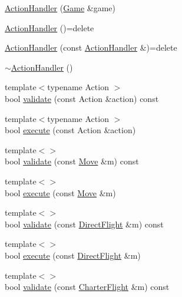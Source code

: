 \begin{DoxyCompactItemize}
\item 
\hyperlink{classpan_1_1_action_handler_a5aeb269dae11a6bd190fafd945a508a1}{Action\+Handler} (\hyperlink{classpan_1_1_game}{Game} \&game)
\item 
\hyperlink{classpan_1_1_action_handler_a56b3a54ca19b9d071adffa0a9ac7b266}{Action\+Handler} ()=delete
\item 
\hyperlink{classpan_1_1_action_handler_a403ff5c81573b682a5dfc9d476be8e4e}{Action\+Handler} (const \hyperlink{classpan_1_1_action_handler}{Action\+Handler} \&)=delete
\item 
\hyperlink{classpan_1_1_action_handler_a5bf64631c974765b04def48c0df0fcd7}{$\sim$\+Action\+Handler} ()
\item 
{\footnotesize template$<$typename Action $>$ }\\bool \hyperlink{classpan_1_1_action_handler_ae2a8bd5ae0560677aeafe7b6c068adb7}{validate} (const Action \&action) const
\item 
{\footnotesize template$<$typename Action $>$ }\\bool \hyperlink{classpan_1_1_action_handler_a7c5cefcd45fe538da04762de3cac0dbd}{execute} (const Action \&action)
\item 
{\footnotesize template$<$$>$ }\\bool \hyperlink{classpan_1_1_action_handler_a3e2fc1b454ace0dd42b3b4bacc22eb0d}{validate} (const \hyperlink{classpan_1_1_move}{Move} \&m) const
\item 
{\footnotesize template$<$$>$ }\\bool \hyperlink{classpan_1_1_action_handler_a97f0f5801dedcbc42396f185686083bb}{execute} (const \hyperlink{classpan_1_1_move}{Move} \&m)
\item 
{\footnotesize template$<$$>$ }\\bool \hyperlink{classpan_1_1_action_handler_aa3788249f03ad2eaa4cdaf375b7da3d2}{validate} (const \hyperlink{classpan_1_1_direct_flight}{Direct\+Flight} \&m) const
\item 
{\footnotesize template$<$$>$ }\\bool \hyperlink{classpan_1_1_action_handler_ad72cd3c55d494ca5941e1b9f46e6d6b7}{execute} (const \hyperlink{classpan_1_1_direct_flight}{Direct\+Flight} \&m)
\item 
{\footnotesize template$<$$>$ }\\bool \hyperlink{classpan_1_1_action_handler_a6eade14ec30fec3d40adf7b3ddbf1ed5}{validate} (const \hyperlink{classpan_1_1_charter_flight}{Charter\+Flight} \&m) const

\end{DoxyCompactItemize}
